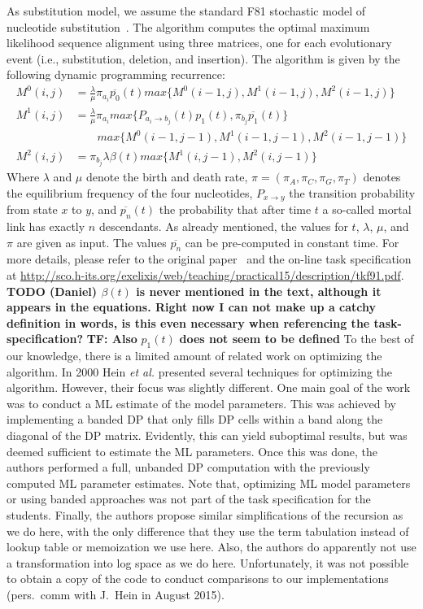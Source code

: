 \documentclass[runningheads,a4paper]{llncs}
\begin{document}
As substitution model, we assume the standard F81 stochastic model of nucleotide substitution~\cite{felsenstein1981evolutionary}.
The algorithm computes the optimal maximum likelihood sequence alignment using three matrices, one for each evolutionary event (i.e., substitution, deletion, and insertion).
The algorithm is given by the following dynamic programming recurrence:
\[
\begin{aligned}
  M^0(i,j)&=\frac{\lambda}{\mu}\pi_{a_i}\overline{p_0}(t)max\{M^0(i-1, j), M^1(i-1,j), M^2(i-1,j)\}\\
  M^1(i,j)&=\frac{\lambda}{\mu}\pi_{a_i}max\{P_{a_i \rightarrow b_j}(t) p_1(t), \pi_{b_j}\overline{p_1}(t)\}\\
          &\quad\quad max\{M^0(i-1, j-1), M^1(i-1,j-1), M^2(i-1,j-1)\}\\
  M^2(i,j)&=\pi_{b_j}\lambda\beta(t)max\{M^1(i,j-1), M^2(i,j-1)\}
\end{aligned}
\]
Where $\lambda$ and $\mu$ denote the birth and death rate, $\pi=(\pi_A,\pi_C,\pi_G,\pi_T)$ denotes the equilibrium frequency of the four nucleotides,
$P_{x \rightarrow y}$ the transition probability from state $x$ to $y$, and $\overline{p_n}(t)$ the probability that after time $t$ a so-called mortal link has exactly $n$ descendants.
As already mentioned, the values for $t$, $\lambda$, $\mu$, and $\pi$ are given as input.
The values $\overline{p_n}$ can be pre-computed in constant time. For more details, please refer to the original paper~\cite{felsenstein1981evolutionary} and the on-line
task specification at \url{http://sco.h-its.org/exelixis/web/teaching/practical15/description/tkf91.pdf}. {\bf TODO (Daniel) $\beta(t)$ is never mentioned in the text, although it appears in the equations. Right now I can not make up a catchy definition in words, is this even necessary when referencing the task-specification?}
\textbf{TF: Also }$p_1(t)$\textbf{ does not seem to be defined}
To the best of our knowledge, there is a limited amount of related work on optimizing the algorithm.
In 2000 Hein {\em et al.}\cite{hein2000statistical} presented several techniques for optimizing the algorithm. However, their focus was slightly different. One main
goal of the work was to conduct a ML estimate of the model parameters. This was achieved by implementing a banded DP that only fills DP cells
within a band along the diagonal of the DP matrix. Evidently, this can yield suboptimal results, but was deemed sufficient to estimate the ML parameters.
Once this was done, the authors performed a full, unbanded DP computation with the previously computed ML parameter estimates.
Note that, optimizing ML model parameters or using banded approaches was not part of the task specification for the students.
Finally, the authors propose similar simplifications of the recursion as we do here, with the only difference that they use
the term tabulation instead of lookup table or memoization we use here.
Also, the authors do apparently not use a transformation into log space as we do here. Unfortunately, it was not possible to obtain
a copy of the code to conduct comparisons to our implementations (pers.~comm with J.~Hein in August 2015).
\end{document}
